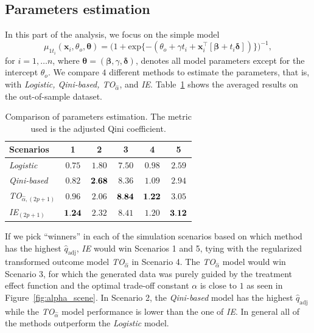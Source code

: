 \documentclass{article}
\def\qadj{\hat{q}_{\mathrm{adj}}}
\def\x{\mathbf x}
\begin{document}
\subsection{Parameters estimation}


In this part of the analysis, we focus on the simple model
\begin{equation*}
  \mu_{1t_i}(\x_i, \theta_o, \boldsymbol{\theta}) =
  \bigl( 1+ \mathrm{exp}\{-(\theta_o + \gamma t_i + \mathbf{x}_i^\top [\boldsymbol{\beta} + t_i \boldsymbol{\delta}] ) \} \bigr)^{-1},
\end{equation*}
for $i=1,\ldots n$, where $\boldsymbol{\theta} = (\boldsymbol{\beta}, \gamma, \boldsymbol{\delta})$, denotes all model parameters except for the intercept $\theta_o$. We compare $4$ different methods to estimate the parameters, that is, with \textit{Logistic, Qini-based, TO$_{\hat{\alpha}}$}, and {\it IE}. Table~\ref{tab:param_estimation_results} shows the averaged results on the out-of-sample dataset. 

\begin{table}[!ht]
    \centering
    \caption{Comparison of parameters estimation. The metric used is the adjusted Qini coefficient.}
    \label{tab:param_estimation_results}
    \begin{tabular}{l|ccccc}
        Scenarios & 1 & 2 & 3 & 4 & 5\\
        \hline
        {\it Logistic} & $0.75$ & $1.80$  & $7.50$ & $0.98$ & $2.59$\\
        {\it Qini-based} & $0.82$ & $\bf2.68$ & $8.36$ & $1.09$ & $2.94$\\
        {\it TO$_{\hat{\alpha},(2p+1)}$} & $0.96$  & $2.06$ & $\bf8.84$ & $\bf1.22$ & $3.05$\\
        {\it IE$_{(2p+1)}$} & $\bf1.24$  & $2.32$ & $8.41$ & $1.20$ & $\bf3.12$\\
        \hline
    \end{tabular}
   
\end{table}



If we pick “winners” in each of the simulation scenarios based on which
method has the highest $\qadj$, {\it IE} would win Scenarios
1 and 5, tying with the regularized transformed outcome model {\it TO$_{\hat{\alpha}}$} in Scenario 4. The {\it TO$_{\hat{\alpha}}$} model would win Scenario 3, for which the generated data was purely guided by the treatment effect function and the optimal trade-off constant $\alpha$ is close to $1$ as seen in Figure~\ref{fig:alpha_scene}. In Scenario 2, the {\it Qini-based} model has the highest $\qadj$ while the {\it TO$_{\hat{\alpha}}$} model performance is lower than the one of {\it IE}. In general all of the methods outperform the {\it Logistic} model.
\end{document}

